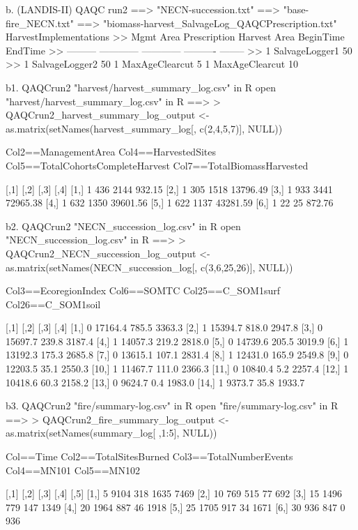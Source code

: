 	b. (LANDIS-II) QAQC run2 
		==> "NECN-succession.txt"
		==> "base-fire_NECN.txt"
		==> "biomass-harvest_SalvageLog_QAQCPrescription.txt"
    HarvestImplementations
>>	Mgmt Area	Prescription	Harvest Area	BeginTime	EndTime
>>	---------	------------	------------	----------	--------
>>	1		SalvageLogger1		50%
>>	1		SalvageLogger2		50%
	1		MaxAgeClearcut		5%
	1		MaxAgeClearcut		10%



	b1. QAQCrun2 "harvest/harvest_summary_log.csv" in R
open "harvest/harvest_summary_log.csv" in R ==>
> QAQCrun2_harvest_summary_log_output <- as.matrix(setNames(harvest_summary_log[, c(2,4,5,7)], NULL))

Col2==ManagementArea
Col4==HarvestedSites
Col5==TotalCohortsCompleteHarvest
Col7==TotalBiomassHarvested

      [,1] [,2] [,3]     [,4]
[1,]    1  436 2144   932.15
[2,]    1  305 1518 13796.49
[3,]    1  933 3441 72965.38
[4,]    1  632 1350 39601.56
[5,]    1  622 1137 43281.59
[6,]    1   22   25   872.76


	b2. QAQCrun2 "NECN_succession_log.csv" in R
open "NECN_succession_log.csv" in R ==>
> QAQCrun2_NECN_succession_log_output <- as.matrix(setNames(NECN_succession_log[, c(3,6,25,26)], NULL))

Col3==EcoregionIndex
Col6==SOMTC
Col25==C_SOM1surf
Col26==C_SOM1soil

      [,1]    [,2]  [,3]   [,4]
 [1,]    0 17164.4 785.5 3363.3
 [2,]    1 15394.7 818.0 2947.8
 [3,]    0 15697.7 239.8 3187.4
 [4,]    1 14057.3 219.2 2818.0
 [5,]    0 14739.6 205.5 3019.9
 [6,]    1 13192.3 175.3 2685.8
 [7,]    0 13615.1 107.1 2831.4
 [8,]    1 12431.0 165.9 2549.8
 [9,]    0 12203.5  35.1 2550.3
[10,]    1 11467.7 111.0 2366.3
[11,]    0 10840.4   5.2 2257.4
[12,]    1 10418.6  60.3 2158.2
[13,]    0  9624.7   0.4 1983.0
[14,]    1  9373.7  35.8 1933.7


	b3. QAQCrun2 "fire/summary-log.csv" in R
open "fire/summary-log.csv" in R ==>
> QAQCrun2_fire_summary_log_output <- as.matrix(setNames(summary_log[ ,1:5], NULL))

Col==Time
Col2==TotalSitesBurned
Col3==TotalNumberEvents
Col4==MN101
Col5==MN102

      [,1] [,2] [,3] [,4] [,5]
[1,]    5 9104  318 1635 7469
[2,]   10  769  515   77  692
[3,]   15 1496  779  147 1349
[4,]   20 1964  887   46 1918
[5,]   25 1705  917   34 1671
[6,]   30  936  847    0  936







